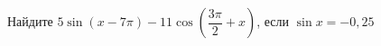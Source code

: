 \begin{ex}
	\begin{condition}
		Найдите \( 5\sin(x-7\pi)-11\cos\left( \dfrac{3\pi}{2}+x \right) \), если \( \sin x = -0,25 \)
	\end{condition}
\end{ex}